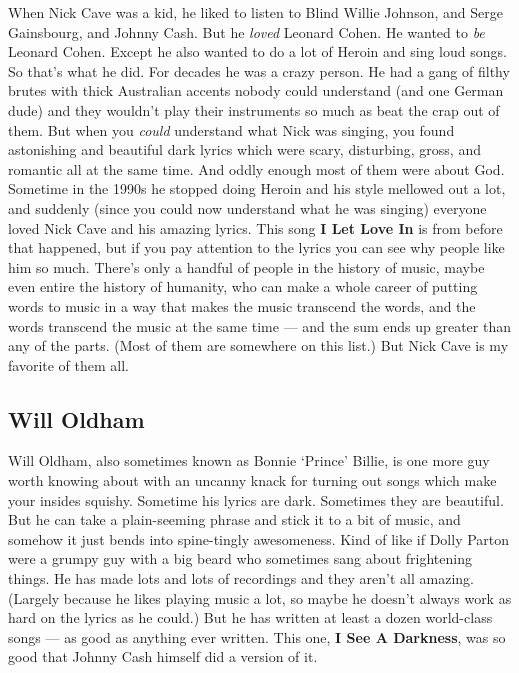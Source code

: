 \documentclass[letterpaper,]{article}
\begin{document}
When Nick Cave was a kid, he liked to listen to Blind Willie Johnson,
and Serge Gainsbourg, and Johnny Cash. But he \emph{loved} Leonard
Cohen. He wanted to \emph{be} Leonard Cohen. Except he also wanted to do
a lot of Heroin and sing loud songs. So that's what he did. For decades
he was a crazy person. He had a gang of filthy brutes with thick
Australian accents nobody could understand (and one German dude) and
they wouldn't play their instruments so much as beat the crap out of
them. But when you \emph{could} understand what Nick was singing, you
found astonishing and beautiful dark lyrics which were scary,
disturbing, gross, and romantic all at the same time. And oddly enough
most of them were about God. Sometime in the 1990s he stopped doing
Heroin and his style mellowed out a lot, and suddenly (since you could
now understand what he was singing) everyone loved Nick Cave and his
amazing lyrics. This song \textbf{I Let Love In} is from before that
happened, but if you pay attention to the lyrics you can see why people
like him so much. There's only a handful of people in the history of
music, maybe even entire the history of humanity, who can make a whole
career of putting words to music in a way that makes the music transcend
the words, and the words transcend the music at the same time --- and
the sum ends up greater than any of the parts. (Most of them are
somewhere on this list.) But Nick Cave is my favorite of them all.

\hypertarget{will-oldham}{%
\subsection{Will Oldham}\label{will-oldham}}

Will Oldham, also sometimes known as Bonnie `Prince' Billie, is one more
guy worth knowing about with an uncanny knack for turning out songs
which make your insides squishy. Sometime his lyrics are dark. Sometimes
they are beautiful. But he can take a plain-seeming phrase and stick it
to a bit of music, and somehow it just bends into spine-tingly
awesomeness. Kind of like if Dolly Parton were a grumpy guy with a big
beard who sometimes sang about frightening things. He has made lots and
lots of recordings and they aren't all amazing. (Largely because he
likes playing music a lot, so maybe he doesn't always work as hard on
the lyrics as he could.) But he has written at least a dozen world-class
songs --- as good as anything ever written. This one, \textbf{I See A
Darkness}, was so good that Johnny Cash himself did a version of it.
\end{document}
